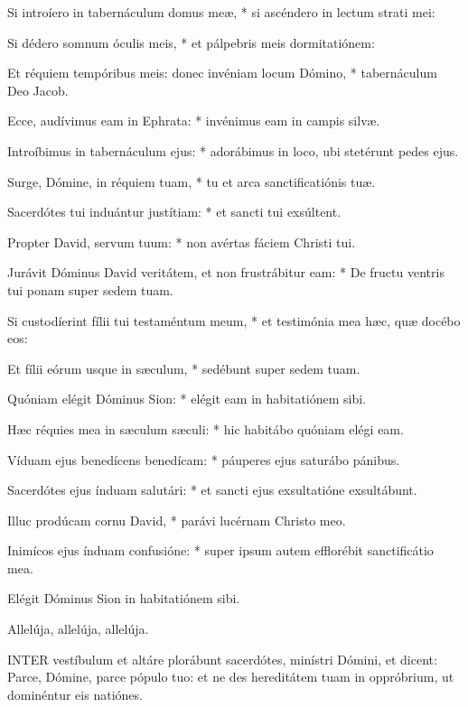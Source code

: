Si introíero in tabernáculum domus meæ, * si ascéndero in lectum strati mei:

Si dédero somnum óculis meis, * et pálpebris meis dormitatiónem:

Et réquiem tempóribus meis: donec invéniam locum Dómino, * tabernáculum Deo Jacob.

Ecce, audívimus eam in Ephrata: * invénimus eam in campis silvæ.

Introíbimus in tabernáculum ejus: * adorábimus in loco, ubi stetérunt pedes ejus.

Surge, Dómine, in réquiem tuam, * tu et arca sanctificatiónis tuæ.

Sacerdótes tui induántur justítiam: * et sancti tui exsúltent.

Propter David, servum tuum: * non avértas fáciem Christi tui.

Jurávit Dóminus David veritátem, et non frustrábitur eam: * De fructu ventris tui ponam super sedem tuam.

Si custodíerint fílii tui testaméntum meum, * et testimónia mea hæc, quæ docébo eos:

Et fílii eórum usque in sæculum, * sedébunt super sedem tuam.

Quóniam elégit Dóminus Sion: * elégit eam in habitatiónem sibi.

Hæc réquies mea in sæculum sæculi: * hic habitábo quóniam elégi eam.

Víduam ejus benedícens benedícam: * páuperes ejus saturábo pánibus.

Sacerdótes ejus índuam salutári: * et sancti ejus exsultatióne exsultábunt.

Illuc prodúcam cornu David, * parávi lucérnam Christo meo.

Inimícos ejus índuam confusióne: * super ipsum autem efflorébit sanctificátio mea.


 Elégit Dóminus Sion in habitatiónem sibi.


 Allelúja, allelúja, allelúja.




\lettrine[lines=2]{I}{NTER} vestíbulum et altáre plorábunt sacerdótes, minístri Dómini, et dicent: Parce, Dómine, parce pópulo tuo: et ne des hereditátem tuam in oppróbrium, ut dominéntur eis natiónes.

